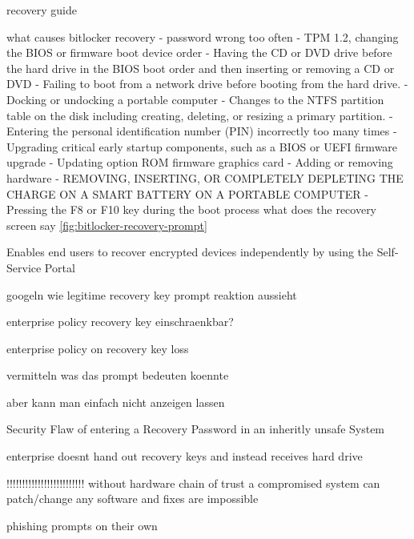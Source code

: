 
recovery guide

what causes bitlocker recovery
- password wrong too often
- TPM 1.2, changing the BIOS or firmware boot device order
- Having the CD or DVD drive before the hard drive in the BIOS boot order and then inserting or removing a CD or DVD
- Failing to boot from a network drive before booting from the hard drive.
- Docking or undocking a portable computer
- Changes to the NTFS partition table on the disk including creating, deleting, or resizing a primary partition.
- Entering the personal identification number (PIN) incorrectly too many times
- Upgrading critical early startup components, such as a BIOS or UEFI firmware upgrade
- Updating option ROM firmware graphics card
- Adding or removing hardware
- REMOVING, INSERTING, OR COMPLETELY DEPLETING THE CHARGE ON A SMART BATTERY ON A PORTABLE COMPUTER
- Pressing the F8 or F10 key during the boot process
what does the recovery screen say \autoref{fig:bitlocker-recovery-prompt}

Enables end users to recover encrypted devices independently by using the Self-Service Portal

googeln wie legitime recovery key prompt reaktion aussieht

enterprise policy recovery key einschraenkbar?

enterprise policy on recovery key loss

vermitteln was das prompt bedeuten koennte

aber kann man einfach nicht anzeigen lassen

Security Flaw of entering a Recovery Password in an inheritly unsafe System

enterprise doesnt hand out recovery keys and instead receives hard drive


!!!!!!!!!!!!!!!!!!!!!!!!!
without hardware chain of trust a compromised system can patch/change any software and fixes are impossible

phishing prompts on their own